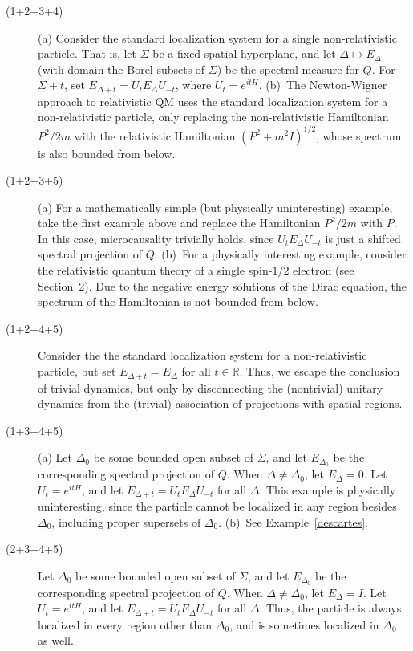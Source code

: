 \documentclass[12pt]{article}
\theoremstyle{remark}
\begin{document}
\begin{description}
\item[\textnormal{(1+2+3+4)}] (a) Consider the standard localization
  system for a single non-relativistic particle.  That is, let
  $\Sigma$ be a fixed spatial hyperplane, and let $\Delta \mapsto
  E_{\Delta}$ (with domain the Borel subsets of $\Sigma$) be the
  spectral measure for $Q$.  For $\Sigma +t$, set $E_{\Delta
    +t}=U_{t}E_{\Delta}U_{-t}$, where $U_{t}=e^{itH}$.  (b)~The
  Newton-Wigner approach to relativistic QM uses the standard
  localization system for a non-relativistic particle, only replacing
  the non-relativistic Hamiltonian $P^{2}/2m$ with the relativistic
  Hamiltonian $(P^{2}+m^{2}I)^{1/2}$, whose spectrum is also bounded
  from below.
\item[\textnormal{(1+2+3+5)}] (a) For a mathematically simple (but
  physically uninteresting) example, take the first example above and
  replace the Hamiltonian $P^{2}/2m$ with $P$.  In this case,
  microcausality trivially holds, since $U_{t}E_{\Delta}U_{-t}$ is
  just a shifted spectral projection of $Q$.  (b)~For a physically
  interesting example, consider the relativistic quantum theory of a
  single spin-$1/2$ electron (see Section~2).  Due to the negative
  energy solutions of the Dirac equation, the spectrum of the
  Hamiltonian is not bounded from below.
\item[\textnormal{(1+2+4+5)}] Consider the the standard localization
  system for a non-relativistic particle, but set $E_{\Delta
    +t}=E_{\Delta}$ for all $t\in \mathbb{R}$.  Thus, we escape the
  conclusion of trivial dynamics, but only by disconnecting the
  (nontrivial) unitary dynamics from the (trivial) association of
  projections with spatial regions.
\item[\textnormal{(1+3+4+5)}] (a) Let $\Delta _{0}$ be some bounded
  open subset of $\Sigma$, and let $E_{\Delta _{0}}$ be the
  corresponding spectral projection of $Q$.  When $\Delta \neq \Delta
  _{0}$, let $E_{\Delta}=0$.  Let $U_{t}=e^{itH}$, and let $E_{\Delta
    +t}=U_{t}E_{\Delta}U_{-t}$ for all $\Delta$.  This example is
  physically uninteresting, since the particle cannot be localized in
  any region besides $\Delta _{0}$, including proper supersets of
  $\Delta _{0}$.  (b)~See Example~\ref{descartes}.
\item[\textnormal{(2+3+4+5)}] Let $\Delta _{0}$ be some bounded open
  subset of $\Sigma$, and let $E_{\Delta _{0}}$ be the corresponding
  spectral projection of $Q$.  When $\Delta \neq \Delta _{0}$, let
  $E_{\Delta}=I$.  Let $U_{t}=e^{itH}$, and let $E_{\Delta
    +t}=U_{t}E_{\Delta}U_{-t}$ for all $\Delta$.  Thus, the particle
  is always localized in every region other than $\Delta _{0}$, and is
  sometimes localized in $\Delta _{0}$ as well.  \end{description}
\end{document}
